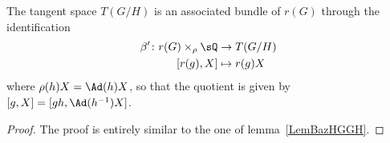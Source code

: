 \begin{lemma}
	The tangent space $T(G/H)$ is an associated bundle of $r(G)$ through the identification
	\begin{equation}
		\begin{aligned}
			\beta'\colon r(G)\times_{\rho}\sQ & \to T(G/H)    \\
			[r(g),X]                          & \mapsto r(g)X
		\end{aligned}
	\end{equation}
	where $\rho(h)X=\Ad(h)X$, so that the quotient is given by $[g,X]=[gh,\Ad(h^{-1})X]$.
\end{lemma}

\begin{proof}
	The proof is entirely similar to the one of lemma~\ref{LemBazHGGH}.
\end{proof}

